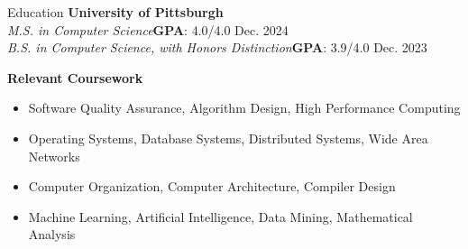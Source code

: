 \begin{resumesection}{Education}
	\textbf{University of Pittsburgh}\\
	\textit{M.S. in Computer Science}\hfill\textbf{GPA}: 4.0/4.0  {Dec. 2024}\\
	\textit{B.S. in Computer Science, with Honors Distinction}\hfill\textbf{GPA}: 3.9/4.0  {Dec. 2023}

	\textbf{Relevant Coursework}
	\vspace{-\parskip}
	\begin{itemize}[nosep, topsep=0pt]
		\item Software Quality Assurance, Algorithm Design, High Performance Computing
		\item Operating Systems, Database Systems, Distributed Systems, Wide Area Networks
		\item Computer Organization, Computer Architecture, Compiler Design
		\item Machine Learning, Artificial Intelligence, Data Mining, Mathematical Analysis
	\end{itemize}
\end{resumesection}

